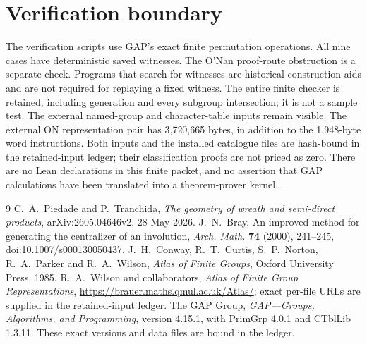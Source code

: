 \documentclass[11pt]{article}
\begin{document}
\section{Verification boundary}
The verification scripts use GAP's exact finite permutation operations. All nine cases have deterministic saved witnesses. The O'Nan proof-route obstruction is a separate check. Programs that search for witnesses are historical construction aids and are not required for replaying a fixed witness. The entire finite checker is retained, including generation and every subgroup intersection; it is not a sample test. The external named-group and character-table inputs remain visible. The external ON representation pair has 3,720,665 bytes, in addition to the 1,948-byte word instructions. Both inputs and the installed catalogue files are hash-bound in the retained-input ledger; their classification proofs are not priced as zero. There are no Lean declarations in this finite packet, and no assertion that GAP calculations have been translated into a theorem-prover kernel.
\begin{thebibliography}{9}
 C.~A.~Piedade and P.~Tranchida, \emph{The geometry of wreath and semi-direct products}, arXiv:2605.04646v2, 28 May 2026.
 J.~N.~Bray, An improved method for generating the centralizer of an involution, \emph{Arch. Math.} \textbf{74} (2000), 241--245, doi:10.1007/s000130050437.
 J.~H.~Conway, R.~T.~Curtis, S.~P.~Norton, R.~A.~Parker and R.~A.~Wilson, \emph{Atlas of Finite Groups}, Oxford University Press, 1985.
 R.~A.~Wilson and collaborators, \emph{Atlas of Finite Group Representations}, \url{https://brauer.maths.qmul.ac.uk/Atlas/}; exact per-file URLs are supplied in the retained-input ledger.
 The GAP Group, \emph{GAP---Groups, Algorithms, and Programming}, version 4.15.1, with PrimGrp 4.0.1 and CTblLib 1.3.11. These exact versions and data files are bound in the ledger.
\end{thebibliography}
\end{document}
